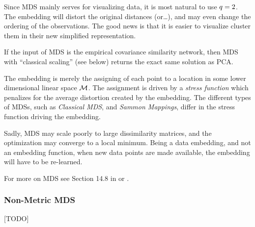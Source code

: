 Since MDS mainly serves for visualizing data, it is most natural to use $q=2$. 
The embedding will distort the original distances (or\dots), and may even change the ordering of the observations. The good news is that it is easier to visualize \andor cluster them in their new simplified representation. 

If the input of MDS is the empirical covariance similarity network, then MDS with ``classical scaling'' (see below) returns the exact same solution as PCA.

The embedding is merely the assigning of each point to a location in some lower dimensional linear space $\mathcal{M}$. 
The assignment is driven by a \emph{stress function} which penalizes for the average distortion created by the embedding.
The different types of MDSs, such as \emph{Classical MDS}, and \emph{Sammon Mappings}, differ in the stress function driving the embedding.

Sadly, MDS may scale poorly to large dissimilarity matrices, and the optimization may converge to a local minimum.
Being a data embedding, and not an embedding function, when new data points are made available, the embedding will have to be re-learned.

For more on MDS see Section 14.8 in \cite{hastie_elements_2003} or \cite{borg_modern_2005}.



\subsubsection{Non-Metric MDS}
[TODO]


